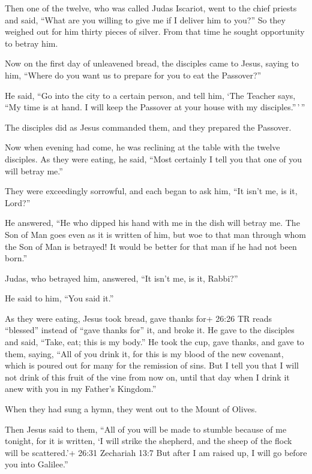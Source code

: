  Then one of the twelve, who was called Judas Iscariot,
went to the chief priests  and said, ``What are you willing
to give me if I deliver him to you?'' So they weighed out for him thirty
pieces of silver.  From that time he sought opportunity to
betray him.

 Now on the first day of unleavened bread, the disciples
came to Jesus, saying to him, ``Where do you want us to prepare for you
to eat the Passover?''

 He said, ``Go into the city to a certain person, and tell
him, `The Teacher says, ``My time is at hand. I will keep the Passover
at your house with my disciples.''\,'\,''

 The disciples did as Jesus commanded them, and they
prepared the Passover.

 Now when evening had come, he was reclining at the table
with the twelve disciples.  As they were eating, he said,
``Most certainly I tell you that one of you will betray me.''

 They were exceedingly sorrowful, and each began to ask
him, ``It isn't me, is it, Lord?''

 He answered, ``He who dipped his hand with me in the dish
will betray me.  The Son of Man goes even as it is written
of him, but woe to that man through whom the Son of Man is betrayed! It
would be better for that man if he had not been born.''

 Judas, who betrayed him, answered, ``It isn't me, is it,
Rabbi?''

He said to him, ``You said it.''

 As they were eating, Jesus took bread, gave thanks for+
26:26 TR reads ``blessed'' instead of ``gave thanks for'' it, and broke
it. He gave to the disciples and said, ``Take, eat; this is my body.''
 He took the cup, gave thanks, and gave to them, saying,
``All of you drink it,  for this is my blood of the new
covenant, which is poured out for many for the remission of sins.
 But I tell you that I will not drink of this fruit of the
vine from now on, until that day when I drink it anew with you in my
Father's Kingdom.''

 When they had sung a hymn, they went out to the Mount of
Olives.

 Then Jesus said to them, ``All of you will be made to
stumble because of me tonight, for it is written, `I will strike the
shepherd, and the sheep of the flock will be scattered.'+ 26:31
Zechariah 13:7  But after I am raised up, I will go before
you into Galilee.''

